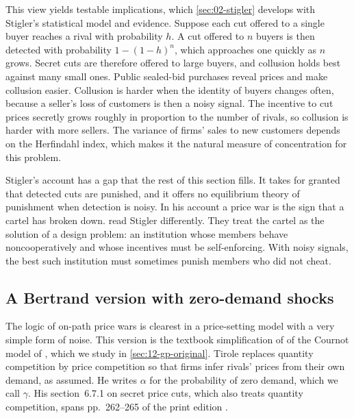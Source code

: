 This view yields testable implications, which \cref{sec:02-stigler} develops with Stigler's statistical model and
evidence. Suppose each cut offered to a single buyer reaches a rival with probability $h$. A cut offered to $n$
buyers is then detected with probability $1 - (1 - h)^n$, which approaches one quickly as $n$ grows. Secret cuts
are therefore offered to large buyers, and collusion holds best against many small ones. Public sealed-bid
purchases reveal prices and make collusion easier. Collusion is harder when the identity of buyers changes often,
because a seller's loss of customers is then a noisy signal. The incentive to cut prices secretly grows roughly in
proportion to the number of rivals, so collusion is harder with more sellers. The variance of firms' sales to new
customers depends on the Herfindahl index, which makes it the natural measure of concentration for this problem.

Stigler's account has a gap that the rest of this section fills. It takes for granted that detected cuts are
punished, and it offers no equilibrium theory of punishment when detection is noisy. In his account a price war is
the sign that a cartel has broken down. \citet{GreenPorter1984} read Stigler differently. They treat the cartel as
the solution of a design problem: an institution whose members behave noncooperatively and whose incentives must be
self-enforcing. With noisy signals, the best such institution must sometimes punish members who did not cheat.

\subsection{A Bertrand version with zero-demand shocks}\label{sec:12-gp-bertrand}

The logic of on-path price wars is clearest in a price-setting model with a very simple form of noise. This version
is the textbook simplification of \citet[section~6.7.1.1]{Tirole1988} of the Cournot model of
\citet{GreenPorter1984}, which we study in \cref{sec:12-gp-original}. Tirole replaces quantity competition by price
competition so that firms infer rivals' prices from their own demand, as \citet{Stigler1964} assumed. He writes
$\alpha$ for the probability of zero demand, which we call $\gamma$. His section~6.7.1 on secret price cuts, which
also treats quantity competition, spans pp.~262--265 of the print edition \citep[p.~16, note~27]{MarshallMarx2012}.


